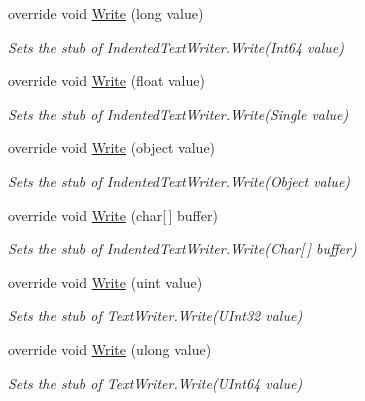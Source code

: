 \begin{DoxyCompactItemize}
override void \hyperlink{class_system_1_1_code_dom_1_1_compiler_1_1_fakes_1_1_stub_indented_text_writer_a755f248515b13865752b3e98b5196f71}{Write} (long value)
\begin{DoxyCompactList}\small\item\em Sets the stub of Indented\-Text\-Writer.\-Write(\-Int64 value)\end{DoxyCompactList}\item 
override void \hyperlink{class_system_1_1_code_dom_1_1_compiler_1_1_fakes_1_1_stub_indented_text_writer_a26b66dc23164e2efcb914579d024a9ff}{Write} (float value)
\begin{DoxyCompactList}\small\item\em Sets the stub of Indented\-Text\-Writer.\-Write(\-Single value)\end{DoxyCompactList}\item 
override void \hyperlink{class_system_1_1_code_dom_1_1_compiler_1_1_fakes_1_1_stub_indented_text_writer_ab0f476c02c490d16b0cd37dbe9e9627e}{Write} (object value)
\begin{DoxyCompactList}\small\item\em Sets the stub of Indented\-Text\-Writer.\-Write(\-Object value)\end{DoxyCompactList}\item 
override void \hyperlink{class_system_1_1_code_dom_1_1_compiler_1_1_fakes_1_1_stub_indented_text_writer_a8516c083c2dd860079344de8d4ccea8b}{Write} (char\mbox{[}$\,$\mbox{]} buffer)
\begin{DoxyCompactList}\small\item\em Sets the stub of Indented\-Text\-Writer.\-Write(\-Char\mbox{[}$\,$\mbox{]} buffer)\end{DoxyCompactList}\item 
override void \hyperlink{class_system_1_1_code_dom_1_1_compiler_1_1_fakes_1_1_stub_indented_text_writer_ab724a8f5da18d488933815a44fa6698b}{Write} (uint value)
\begin{DoxyCompactList}\small\item\em Sets the stub of Text\-Writer.\-Write(\-U\-Int32 value)\end{DoxyCompactList}\item 
override void \hyperlink{class_system_1_1_code_dom_1_1_compiler_1_1_fakes_1_1_stub_indented_text_writer_aa5df75d5b6f9d1b6750e12585cad7a5f}{Write} (ulong value)
\begin{DoxyCompactList}\small\item\em Sets the stub of Text\-Writer.\-Write(\-U\-Int64 value)\end{DoxyCompactList}\item 

\end{DoxyCompactItemize}

